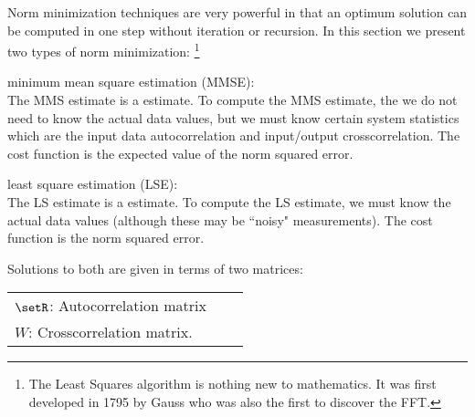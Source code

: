 Norm minimization techniques are very powerful
in that an optimum solution can be computed
in one step without iteration or recursion.
In this section we present two types of norm minimization:
\footnote{
   The Least Squares algorithm is nothing new to mathematics.
   It was first developed in 1795 by Gauss who was also the first
   to discover the FFT.
   }

\begin{enume}
  \item minimum mean square estimation (MMSE): \\
        The MMS estimate is a  estimate.
        To compute the MMS estimate, the we do not need to know
        the actual data values, but we must know certain system statistics
        which are the
        input data autocorrelation and input/output crosscorrelation.
        The cost function is the expected value of the norm squared error.
   \item least square estimation (LSE): \\
        The LS estimate is a  estimate.
        To compute the LS estimate, we must know the actual data values
        (although these may be ``noisy" measurements).
        The cost function is the norm squared error.
\end{enume}

Solutions to both are given in terms of two matrices:

\begin{tabular}{lll}
   $\setR$: Autocorrelation matrix \\
   $W$: Crosscorrelation matrix.
\end{tabular}

